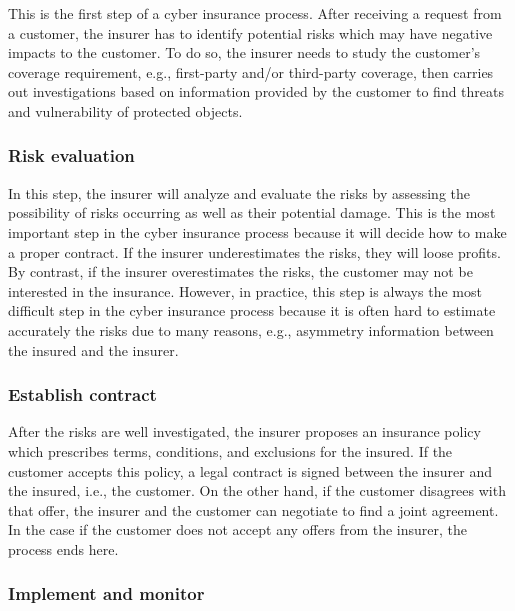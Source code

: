 \documentclass[twocolumn,10pt]{IEEEtran}
\begin{document}
This is the first step of a cyber insurance process.  After receiving a request from a customer, the insurer has to identify potential risks which may have negative impacts to the customer. To do so, the insurer needs to study the customer's coverage requirement, e.g., first-party and/or third-party coverage, then carries out investigations based on information provided by the customer to find threats and vulnerability of protected objects. 


\subsubsection{Risk evaluation} 

In this step, the insurer will analyze and evaluate the risks by assessing the possibility of risks occurring as well as their potential damage. This is the most important step in the cyber insurance process because it will decide how to make a proper contract. If the insurer underestimates the risks, they will loose profits. By contrast, if the insurer overestimates the risks, the customer may not be interested in the insurance. However, in practice, this step is always the most difficult step in the cyber insurance process because it is often hard to estimate accurately the risks due to many reasons, e.g., asymmetry information between the insured and the insurer. 


\subsubsection{Establish contract} 

After the risks are well investigated, the insurer proposes an insurance policy which prescribes terms, conditions, and exclusions for the insured. If the customer accepts this policy, a legal contract is signed between the insurer and the insured, i.e., the customer. On the other hand, if the customer disagrees with that offer, the insurer and the customer can negotiate to find a joint agreement. In the case if the customer does not accept any offers from the insurer, the process ends here. 


\subsubsection{Implement and monitor}
\end{document}
